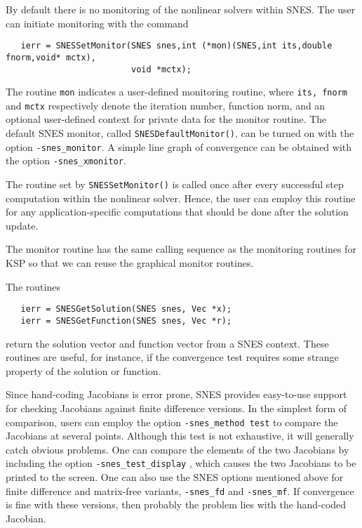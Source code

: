 By default there is no monitoring of the nonlinear solvers within SNES. 
The user can initiate monitoring with the command  
\begin{verbatim}
   ierr = SNESSetMonitor(SNES snes,int (*mon)(SNES,int its,double fnorm,void* mctx),
                         void *mctx);
\end{verbatim}
The routine {\tt mon} indicates a user-defined monitoring routine,
where {\tt its, fnorm} and {\tt mctx} respectively denote the iteration
number, function norm, and an optional user-defined context
for private data for the monitor routine.  The default SNES 
monitor, called {\tt SNESDefaultMonitor()}, 
can be turned on with the option {\tt -snes\_monitor}. 
A simple line graph of convergence can be obtained with the option
{\tt -snes\_xmonitor}. 

The routine set by {\tt SNESSetMonitor()} is called once after every
successful step computation within the nonlinear solver.  Hence, the
user can employ this routine for any application-specific computations
that should be done after the solution update.

\begin{design}
The monitor routine has the same calling sequence as the monitoring 
routines for KSP so that we can reuse the graphical monitor routines.
\end{design}

The routines  
\begin{verbatim}
   ierr = SNESGetSolution(SNES snes, Vec *x);
   ierr = SNESGetFunction(SNES snes, Vec *r);
\end{verbatim}
return the solution vector and function vector from a SNES context. 
These routines are useful, for instance, if the convergence test requires 
some strange property of the solution or function.

Since hand-coding Jacobians is error prone, SNES provides easy-to-use
support for checking Jacobians against finite difference versions. In
the simplest form of comparison, users can employ the option 
{\tt -snes\_method test} to compare the Jacobians at several points.
Although this test is not exhaustive, it will generally catch obvious
problems.  One can compare the elements of the two Jacobians by
including the option {\tt -snes\_test\_display}
, which causes the two Jacobians to be
printed to the screen.  One can also use the SNES options mentioned
above for finite difference and matrix-free variants, {\tt -snes\_fd}
and {\tt -snes\_mf}.  If convergence is fine with these versions, then
probably the problem lies with the hand-coded 
Jacobian. 

